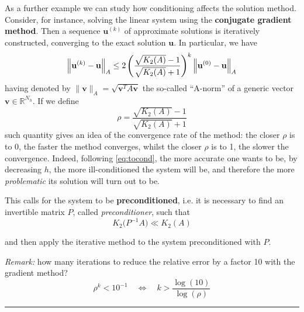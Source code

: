 As a further example we can study how conditioning affects the solution method. Consider, for instance, solving the linear system using the \textbf{conjugate gradient method}. Then a sequence $\mathbf{u}^{(k)}$ of approximate solutions is iteratively constructed, converging to the exact solution $\mathbf{u}$. In particular, we have
\begin{equation*}
\left\lVert \mathbf{u}^{(k)} - \mathbf{u} \right\rVert_A \leq 2 \left( \frac{\sqrt{K_2(A)} - 1}{\sqrt{K_2(A)} + 1} \right)^k \left\lVert \mathbf{u}^{(0)} - \mathbf{u} \right\rVert_A
\end{equation*}
having denoted by $\|\mathbf{v}\|_A = \sqrt{\mathbf{v}^T A \mathbf{v}}$ the so-called “A-norm” of a generic vector $\mathbf{v} \in \mathbb{R}^{N_h}$. If we define
\begin{equation*}
\rho = \frac{\sqrt{K_2(A)} - 1}{\sqrt{K_2(A)} + 1}
\end{equation*}
such quantity gives an idea of the convergence rate of the method: the closer $\rho$ is to 0, the faster the method converges, whilst the closer $\rho$ is to 1, the slower the convergence. Indeed, following \eqref{eq:tocond}, the more accurate one wants to be, by decreasing $h$, the more ill-conditioned the system will be, and therefore the more \emph{problematic} its solution will turn out to be.

\smallskip

This calls for the system to be \textbf{preconditioned}, i.e. it is necessary to find an invertible matrix $P$, called \textit{preconditioner}, such that
\begin{equation*}
K_2\big(P^{-1} A\big) \ll K_2(A)
\end{equation*}

and then apply the iterative method to the system preconditioned with $P$.

\smallskip

\emph{Remark:} how many iterations to reduce the relative error by a factor 10 with the gradient method?
\begin{equation*}
\rho^k<10^{-1}\quad \Longleftrightarrow\quad k>\frac{\log(10)}{\log(\rho)} 
\end{equation*}

\rule{0.47\textwidth}{0.2pt}











